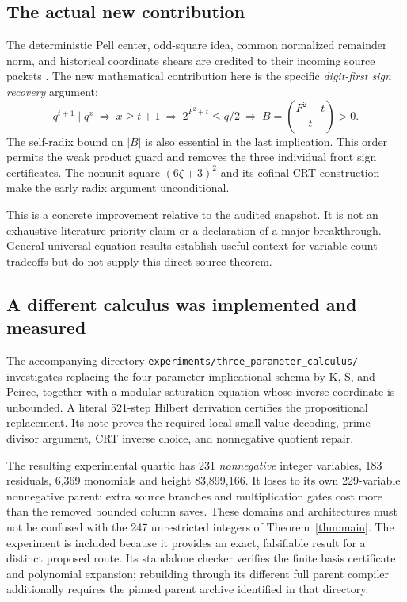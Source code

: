 \documentclass[11pt,letterpaper]{article}
\newcommand{\file}[1]{\texttt{\nolinkurl{#1}}}
\begin{document}
\subsection{The actual new contribution}

The deterministic Pell center, odd-square idea, common normalized
remainder norm, and historical coordinate shears are credited to
their incoming source packets \cite{center,budgets,common,shared}.
The new mathematical contribution here is the specific
\emph{digit-first sign recovery} argument:
\[
 q^{t+1}\mid q^x
 \ \Longrightarrow\ x\ge t+1
 \ \Longrightarrow\ 2^{F^2+t}\le q/2
 \ \Longrightarrow\ B=\binom{F^2+t}{t}>0.
\]
The self-radix bound on $|B|$ is also essential in the last implication.
This order permits the weak product guard and removes the three
individual front sign certificates. The nonunit square
$(6\zeta+3)^2$ and its cofinal CRT construction make the early radix
argument unconditional.

This is a concrete improvement relative to the audited snapshot.
It is not an exhaustive literature-priority claim or a declaration
of a major breakthrough. General universal-equation results
\cite{jones,bayer,sun} establish useful context for variable-count
tradeoffs but do not supply this direct source theorem.

\subsection{A different calculus was implemented and measured}

The accompanying directory
\file{experiments/three_parameter_calculus/} investigates replacing
the four-parameter implicational schema by K, S, and Peirce, together
with a modular saturation equation whose inverse coordinate is
unbounded. A literal 521-step Hilbert derivation certifies the
propositional replacement. Its note proves the required local
small-value decoding, prime-divisor argument, CRT inverse choice,
and nonnegative quotient repair.

The resulting experimental quartic has 231 \emph{nonnegative}
integer variables, 183 residuals, 6,369 monomials and height
83,899,166. It loses to its own 229-variable nonnegative parent:
extra source branches and multiplication gates cost more than the
removed bounded column saves. These domains and architectures
must not be confused with the 247 unrestricted integers of
Theorem~\ref{thm:main}. The experiment is included because it
provides an exact, falsifiable result for a distinct proposed route.
Its standalone checker verifies the finite basis certificate and
polynomial expansion; rebuilding through its different full parent
compiler additionally requires the pinned parent archive identified
in that directory.
\end{document}
